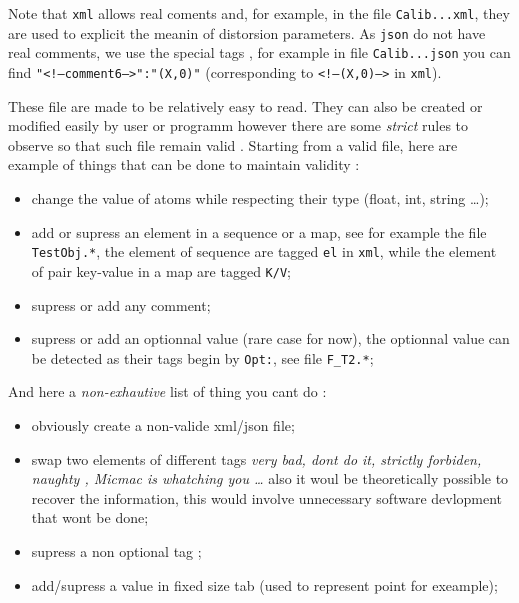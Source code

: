Note that {\tt xml} allows real coments and, for example, in the file {\tt Calib...xml}, they are used to
explicit  the meanin of distorsion parameters. As {\tt json} do not have
real comments, we use the special tags , for example in file
{\tt Calib...json} you can find {\tt "<!--comment6-->":"(X,0)"}
(corresponding to  {\tt <!--(X,0)-->} in {\tt xml}).

These file are made to be relatively easy to read. They can also be created or
modified easily by user or programm however there are some \emph{strict} rules to observe so that such
file remain valid . Starting from a valid file, here are example of things that can be done to maintain
validity :

\begin{itemize}
       \item change the value of atoms while respecting their type (float, int, string \dots);

       \item add or supress an element  in a sequence or a map,  see for example  the file
	       {\tt TestObj.*}, the element of sequence are tagged {\tt el} in {\tt xml}, while the element of
		pair key-value  in a map are tagged {\tt K/V};

       \item supress or add any comment;

       \item supress or add an optionnal value (rare case for now), the optionnal value can
	     be  detected as their tags begin by {\tt Opt:}, see file {\tt F\_T2.*};
\end{itemize}

And here a \emph{non-exhautive} list of thing you cant do :

\begin{itemize}
        \item obviously create a non-valide xml/json file;

	\item swap two elements of different tags  \emph{very bad, dont do it, strictly forbiden, naughty , Micmac is whatching you \dots}
          also it woul be theoretically possible to recover the information, this would involve unnecessary software devlopment
	  that wont be done;

        \item supress a non optional tag ;

	\item add/supress a value in fixed size tab (used to represent point for exeample);
\end{itemize}

